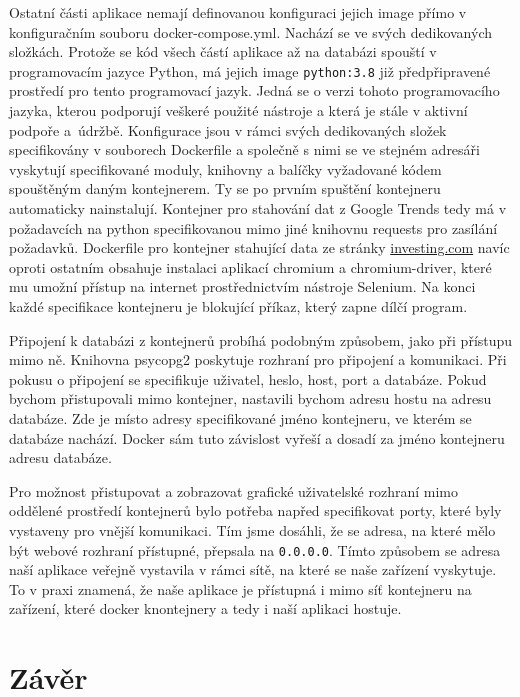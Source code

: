 Ostatní části aplikace nemají definovanou konfiguraci jejich image přímo v konfiguračním souboru docker-compose.yml. 
Nachází se ve svých dedikovaných složkách. 
Protože se kód všech částí aplikace až na databázi spouští v programovacím jazyce Python, má jejich image \verb|python:3.8| již předpřipravené prostředí pro tento programovací jazyk. 
Jedná se o verzi tohoto programovacího jazyka, kterou podporují veškeré použité nástroje a která je stále v aktivní podpoře a~údržbě. 
Konfigurace jsou v rámci svých dedikovaných složek specifikovány v souborech Dockerfile a společně s nimi se ve stejném adresáři vyskytují specifikované moduly, knihovny a balíčky vyžadované kódem spouštěným daným kontejnerem. 
Ty se po prvním spuštění kontejneru automaticky nainstalují.
Kontejner pro stahování dat z Google Trends tedy má v požadavcích na python specifikovanou mimo jiné knihovnu requests pro zasílání požadavků. 
Dockerfile pro kontejner stahující data ze stránky \url{investing.com} navíc oproti ostatním obsahuje instalaci aplikací chromium a chromium-driver, které mu umožní přístup na internet prostřednictvím nástroje Selenium. 
Na konci každé specifikace kontejneru je blokující příkaz, který zapne dílčí program. 

Připojení k databázi z kontejnerů probíhá podobným způsobem, jako při přístupu mimo ně. 
Knihovna psycopg2 poskytuje rozhraní pro připojení a komunikaci. 
Při pokusu o připojení se specifikuje uživatel, heslo, host, port a databáze. 
Pokud bychom přistupovali mimo kontejner, nastavili bychom adresu hostu na adresu databáze. 
Zde je místo adresy specifikované jméno kontejneru, ve kterém se databáze nachází. 
Docker sám tuto závislost vyřeší a dosadí za jméno kontejneru adresu databáze. 

\newpage

Pro možnost přistupovat a zobrazovat grafické uživatelské rozhraní mimo oddělené prostředí kontejnerů bylo potřeba napřed specifikovat porty, které byly vystaveny pro vnější komunikaci. 
Tím jsme dosáhli, že se adresa, na které mělo být webové rozhraní přístupné, přepsala na \verb|0.0.0.0|. 
Tímto způsobem se adresa naší aplikace veřejně vystavila v rámci sítě, na které se naše zařízení vyskytuje. 
To v praxi znamená, že naše aplikace je přístupná i mimo síť kontejneru na zařízení, které docker knontejnery a tedy i naší aplikaci hostuje.

\chapter{Závěr}

